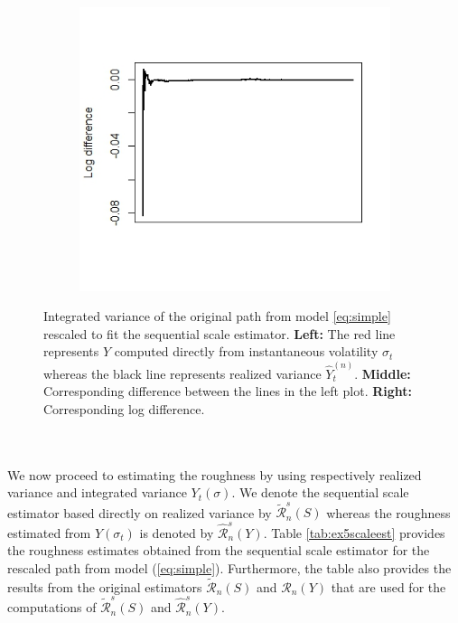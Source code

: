 \documentclass{article}
\begin{document}
\begin{figure}[h]
\begin{subfigure}{0.32\textwidth}
    \end{subfigure}\hfill
    \begin{subfigure}{0.32\textwidth}
        \centering
        \includegraphics[width=\textwidth]{ex5_scale3.jpeg}
    \end{subfigure}
    \caption{Integrated variance of the original path from model \eqref{eq:simple} rescaled to fit the sequential scale estimator. \textbf{Left:} The red line represents $Y$ computed directly from instantaneous volatility $\sigma_t$ whereas the black line represents realized variance $\hat{Y}_t^{(n)}$. \textbf{Middle:} Corresponding difference between the lines in the left plot. \textbf{Right:} Corresponding log difference.}
    \label{fig:ex5scale}
\end{figure}\\\\
We now proceed to estimating the roughness by using respectively realized variance and integrated variance $Y_t(\sigma)$. We denote the sequential scale estimator based directly on realized variance by $\widetilde{\mathscr{R}}_n^s (S)$ whereas the roughness estimated from $Y(\sigma_t)$ is denoted by $\widehat{\mathscr{R}}_n^s (Y)$. Table \ref{tab:ex5scaleest} provides the roughness estimates obtained from the sequential scale estimator for the rescaled path from model (\ref{eq:simple}). Furthermore, the table also provides the results from the original estimators $\widetilde{\mathscr{R}}_n (S)$ and $\widehat{\mathscr{R}}_n (Y)$ that are used for the computations of $\widetilde{\mathscr{R}}_n^s (S)$ and $\widehat{\mathscr{R}}_n^s (Y)$.
\end{document}
